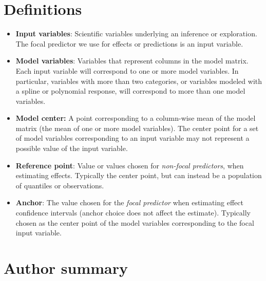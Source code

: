 \section*{Definitions}

\begin{itemize}
\item \textbf{Input variables}: Scientific variables underlying an inference or exploration. The focal predictor we use for effects or predictions is an input variable.
\item \textbf{Model variables}: Variables that represent columns in the model matrix. Each input variable will correspond to one or more model variables. In particular, variables with more than two categories, or variables modeled with a spline or polynomial response, will correspond to more than one model variables.
\item\textbf{Model center:} A point corresponding to a column-wise mean of the model matrix (the mean of one or more model variables). The center point for a set of model variables corresponding to an input variable may not represent a possible value of the input variable.
\item \textbf{Reference point}: Value or values chosen for \emph{non-focal predictors}, when estimating effects. Typically the center point, but can instead be a population of quantiles or observations. 
\item \textbf{Anchor}: The value chosen for the \emph{focal predictor} when estimating effect confidence intervals (anchor choice does not affect the estimate). Typically chosen as the center point of the model variables corresponding to the focal input variable.
\end{itemize}

\section*{Author summary}

